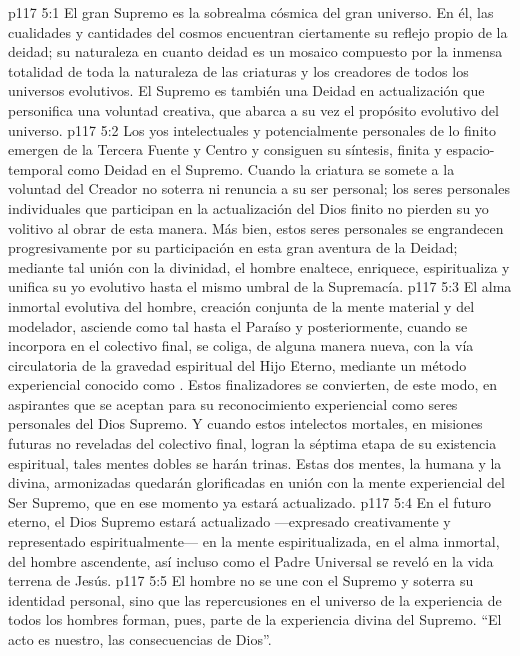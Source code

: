 \vs p117 5:1 El gran Supremo es la sobrealma cósmica del gran universo. En él, las cualidades y cantidades del cosmos encuentran ciertamente su reflejo propio de la deidad; su naturaleza en cuanto deidad es un mosaico compuesto por la inmensa totalidad de toda la naturaleza de las criaturas y los creadores de todos los universos evolutivos. El Supremo es también una Deidad en actualización que personifica una voluntad creativa, que abarca a su vez el propósito evolutivo del universo.
\vs p117 5:2 Los yos intelectuales y potencialmente personales de lo finito emergen de la Tercera Fuente y Centro y consiguen su síntesis, finita y espacio\hyp{}temporal como Deidad en el Supremo. Cuando la criatura se somete a la voluntad del Creador no soterra ni renuncia a su ser personal; los seres personales individuales que participan en la actualización del Dios finito no pierden su yo volitivo al obrar de esta manera. Más bien, estos seres personales se engrandecen progresivamente por su participación en esta gran aventura de la Deidad; mediante tal unión con la divinidad, el hombre enaltece, enriquece, espiritualiza y unifica su yo evolutivo hasta el mismo umbral de la Supremacía.
\vs p117 5:3 \pc El alma inmortal evolutiva del hombre, creación conjunta de la mente material y del modelador, asciende como tal hasta el Paraíso y posteriormente, cuando se incorpora en el colectivo final, se coliga, de alguna manera nueva, con la vía circulatoria de la gravedad espiritual del Hijo Eterno, mediante un método experiencial conocido como . Estos finalizadores se convierten, de este modo, en aspirantes que se aceptan para su reconocimiento experiencial como seres personales del Dios Supremo. Y cuando estos intelectos mortales, en misiones futuras no reveladas del colectivo final, logran la séptima etapa de su existencia espiritual, tales mentes dobles se harán trinas. Estas dos mentes, la humana y la divina, armonizadas quedarán glorificadas en unión con la mente experiencial del Ser Supremo, que en ese momento ya estará actualizado.
\vs p117 5:4 En el futuro eterno, el Dios Supremo estará actualizado ---expresado creativamente y representado espiritualmente--- en la mente espiritualizada, en el alma inmortal, del hombre ascendente, así incluso como el Padre Universal se reveló en la vida terrena de Jesús.
\vs p117 5:5 \pc El hombre no se une con el Supremo y soterra su identidad personal, sino que las repercusiones en el universo de la experiencia de todos los hombres forman, pues, parte de la experiencia divina del Supremo. “El acto es nuestro, las consecuencias de Dios”.
